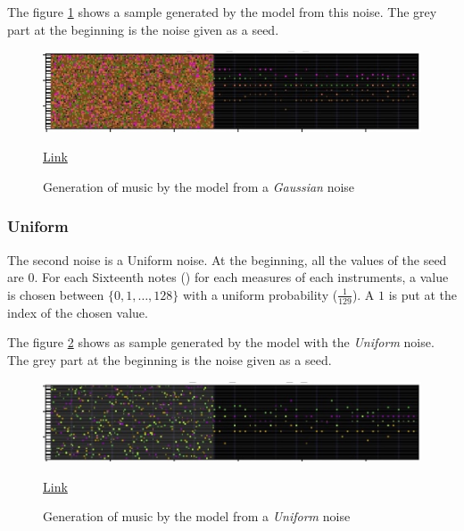 \documentclass[12pt]{report}
\begin{document}
The figure \ref{fig:task:noise:gaussian} shows a sample generated by the model from this noise.
The grey part at the beginning is the noise given as a seed.

\begin{figure}[htbp]
    \centering
    \includegraphics[width=\textwidth]{images/generated_midis/tasks/generate-noise/generate-noise-gaussian.jpg}
    \caption{Generation of music by the model from a \textit{Gaussian} noise}
    \href{https://github.com/ValentinVignal/midiGenerator/blob/master/samples/tasks/generated_noise_gaussian.mid}{Link}
    \label{fig:task:noise:gaussian}
\end{figure}

\subsubsection{Uniform}

The second noise is a Uniform noise.
At the beginning, all the values of the seed are $0$.
For each Sixteenth notes (\musSixteenth) for each measures of each instruments, a value is chosen between $\{0, 1, \dots, 128\}$ with a uniform probability ($\frac{1}{129}$).
A $1$ is put at the index of the chosen value.

The figure \ref{fig:task:noise:uniform} shows as sample generated by the model with the \textit{Uniform} noise.
The grey part at the beginning is the noise given as a seed.

\begin{figure}[htbp]
    \centering
    \includegraphics[width=\textwidth]{images/generated_midis/tasks/generate-noise/generate-noise-softmax.jpg}
    \caption{Generation of music by the model from a \textit{Uniform} noise}
    \href{https://github.com/ValentinVignal/midiGenerator/blob/master/samples/tasks/generated_noise_softmax.mid}{Link}
    \label{fig:task:noise:uniform}
\end{figure}
\end{document}
